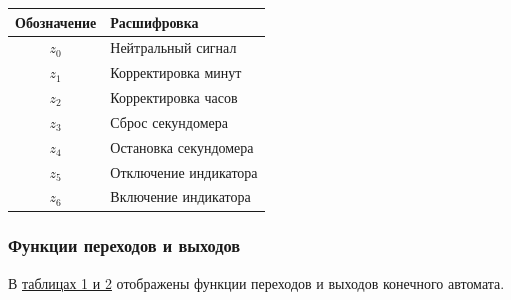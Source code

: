 \documentclass[10pt,a4paper,final]{article} %
\begin{document}
\begin{table}[htbp]
	\centering
	\begin{tabular}{|c|l|}
		\hline
		Обозначение & Расшифровка  \\ 
		\hline
		$z_0$ & Нейтральный сигнал				\\%
		$z_1$ & Корректировка минут\\%
		$z_2$ & Корректировка часов	\\%
		$z_3$ & Сброс секундомера		\\%
		$z_4$ & Остановка секундомера	\\%
		$z_5$ & Отключение индикатора\\%
		$z_6$ & Включение индикатора	\\ %
		
		\hline
	\end{tabular}
\end{table}


\subsubsection{Функции переходов и выходов}

В \hyperref[func]{таблицах 1 и 2} отображены функции переходов и выходов конечного автомата.
\end{document}
